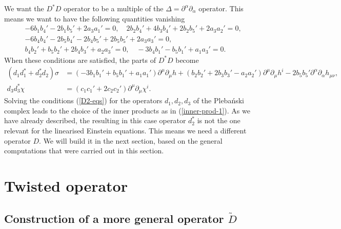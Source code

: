 \documentclass[10pt]{report}
\newcommand{\pleb}[0]{Pleba\'nski}
\theoremstyle{definition}
\begin{document}
 We want the $D^* D$ operator to be a multiple of the $\Delta=\partial^\alpha \partial_\alpha$ operator. This means we want to have the following quantities vanishing
 \begin{align}\label{D2-eqs}
 -6 b_1 b_4' - 2 b_1b_5' + 2a_3 a_1' =0, \quad 2b_2 b_4' + 4b_3 b_4' +  2b_2 b_5' + 2a_3 a_2' =0, \\ \nonumber
  -6 b_4 b_4'  - 2b_5 b_4' -  2b_4 b_5'+  2 b_5 b_5'+ 2 a_3 a_3' =0, 
 \\ \nonumber
 b_4 b_2' +  b_5 b_2' + 2b_4 b_3' + a_2 a_3' =0, \quad -3 b_4 b_1'  - b_5 b_1' + a_1 a_3'=0.
 \end{align}
 When these conditions are satisfied, the parts of $D^* D$ become
 \begin{align}\nonumber
 (d_1 d_1^* +d_2^* d_2 ) \sigma &=  ( - 3 b_1 b_1' + b_5 b_1' + a_1 a_1' ) \partial^\mu \partial_\mu h +(b_2  b_2' + 2 b_3 b_3'  - a_2 a_2' )\partial^\mu \partial_\mu h^i -  2 b_5 b_5'  \partial^\alpha \partial_\alpha h_{\mu\nu}, \\ \nonumber
 d_3 d_3^* \chi &= ( c_1 c_1' + 2 c_2 c_2')\partial^\mu \partial_\mu \chi^i.
 \end{align}
Solving the conditions (\ref{D2-eqs}) for the operators $d_1, d_2, d_3$ of the \pleb{} complex leads to the choice of the inner products as in (\ref{inner-prod-1}). As we have already described, the resulting in this case operator $d_2^*$ is not the one relevant for the linearised Einstein equations. This means we need a different operator $D$. We will build it in the next section, based on the general computations that were carried out in this section.  
 
\section{Twisted operator}

\subsection{Construction of a more general operator \texorpdfstring{$\tilde{D}$}{}}
\end{document}
